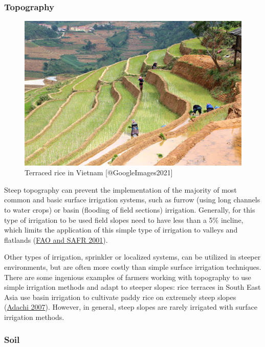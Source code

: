 \documentclass[12pt,twoside]{reedthesis}
\begin{document}
\hypertarget{topo}{%
\subsubsection{Topography}\label{topo}}
\begin{figure}
\includegraphics[width=0.5\linewidth]{figure/TerraceRicePic} \caption{Terraced rice in Vietnam [@GoogleImages2021]}\label{fig:unnamed-chunk-4}
\end{figure}
Steep topography can prevent the implementation of the majority of most common and basic surface irrigation systems, such as furrow (using long channels to water crops) or basin (flooding of field sections) irrigation. Generally, for this type of irrigation to be used field slopes need to have less than a 5\% incline, which limits the application of this simple type of irrigation to valleys and flatlands (\protect\hyperlink{ref-faoIrrigationManualPlanning2001}{FAO and SAFR 2001}).

Other types of irrigation, sprinkler or localized systems, can be utilized in steeper environments, but are often more costly than simple surface irrigation techniques. There are some ingenious examples of farmers working with topography to use simple irrigation methods and adapt to steeper slopes: rice terraces in South East Asia use basin irrigation to cultivate paddy rice on extremely steep slopes (\protect\hyperlink{ref-adachiAgriculturalTechnologiesTerraced2007}{Adachi 2007}). However, in general, steep slopes are rarely irrigated with surface irrigation methods.

\hypertarget{soil}{%
\subsubsection{Soil}\label{soil}}
\end{document}
